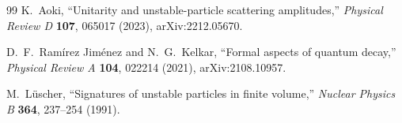 \documentclass[11pt]{article}
\theoremstyle{remark}
\begin{document}
\begin{thebibliography}{99}
K.~Aoki,
``Unitarity and unstable-particle scattering amplitudes,''
\textit{Physical Review D} \textbf{107}, 065017 (2023),
arXiv:2212.05670.

D.~F.~Ram\'irez Jim\'enez and N.~G.~Kelkar,
``Formal aspects of quantum decay,''
\textit{Physical Review A} \textbf{104}, 022214 (2021),
arXiv:2108.10957.

M.~L\"uscher,
``Signatures of unstable particles in finite volume,''
\textit{Nuclear Physics B} \textbf{364}, 237--254 (1991).

\end{thebibliography}
\end{document}
